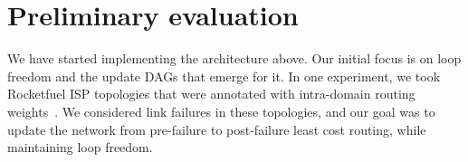 


\section{Preliminary evaluation}
\label{sec:eval}

We have started implementing the architecture above. Our initial focus is on loop freedom and the update DAGs that emerge for it. In one experiment, we took Rocketfuel ISP topologies that were annotated with intra-domain routing weights~\cite{rocketfuel-weights}. We considered link failures in these topologies, and our goal was to update the network from pre-failure to post-failure least cost routing, while maintaining loop freedom.

